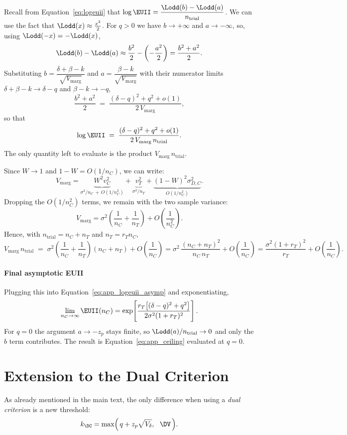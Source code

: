 Recall from Equation~\eqref{eq:logeuii} that $\log\EUII = \dfrac{\Lodd(b)-\Lodd(a)}{n_{\text{trial}}}$. We can use the fact that $\Lodd(x)\approx\tfrac{x^2}{2}$. For $q>0$ we have $b\to+\infty$ and $a\to-\infty$, so, using $\Lodd(-x)=-\Lodd(x)$,
\[
  \Lodd(b)-\Lodd(a) \approx \frac{b^2}{2} - \left(-\frac{a^2}{2}\right) = \frac{b^2+a^2}{2}.
\]
Substituting $b=\dfrac{\delta+\beta-k}{\sqrt{V_{\text{marg}}}}$ and $a=\dfrac{\beta-k}{\sqrt{V_{\text{marg}}}}$ with their numerator limits $\delta+\beta-k\to\delta-q$ and $\beta-k\to-q$,
\[
  \frac{b^2+a^2}{2} \;=\; \frac{(\delta-q)^2+q^2+o(1)}{2\,V_{\text{marg}}},
\]
so that
\begin{equation}\label{eq:app_logeuii_asymp}
  \log\EUII \;=\; \frac{(\delta-q)^2+q^2+o(1)}{2\,V_{\text{marg}}\,n_{\text{trial}}} .
\end{equation}
The only quantity left to evaluate is the product $V_{\text{marg}}\,n_{\text{trial}}$.

Since $W\to1$ and $1-W=O(1/n_C)$, we can write:
\[
  V_{\text{marg}}
  = \underbrace{W^2 v_C^2}_{\sigma^2/n_C \,+\, O(1/n_C^2)}
  + \underbrace{v_T^2}_{\sigma^2/n_T}
  + \underbrace{(1-W)^2 \sigma_{D,C}^2}_{O(1/n_C^2)} .
\]
Dropping the $O(1/n_C^2)$ terms, we remain with the two sample variance:
\[
  V_{\text{marg}} = \sigma^2\!\left(\frac{1}{n_C}+\frac{1}{n_T}\right) + O\!\left(\frac{1}{n_C^2}\right).
\]
Hence, with $n_{\text{trial}}=n_C+n_T$ and $n_T=r_T n_C$,
\[
  V_{\text{marg}}\,n_{\text{trial}}
  \;=\; \sigma^2\!\left(\frac{1}{n_C}+\frac{1}{n_T}\right)(n_C+n_T) + O\!\left(\frac{1}{n_C}\right)
  = \sigma^2\,\frac{(n_C+n_T)^2}{n_C\, n_T} + O\!\left(\frac{1}{n_C}\right)
  = \frac{\sigma^2(1+r_T)^2}{r_T} + O\!\left(\frac{1}{n_C}\right) .
\]

\paragraph{Final asymptotic EUII}
Plugging this into Equation~\eqref{eq:app_logeuii_asymp} and exponentiating,
\begin{equation}\label{eq:app_ceiling}
  \lim_{n_C\to\infty}\EUII(n_C)
  = \exp\!\left[\frac{r_T\big[(\delta-q)^2+q^2\big]}{2\sigma^2(1+r_T)^2}\right].
\end{equation}
For $q=0$ the argument $a\to-z_p$ stays finite, so $\Lodd(a)/n_{\text{trial}}\to0$ and only the $b$ term contributes. The result is Equation~\eqref{eq:app_ceiling} evaluated at $q=0$.


\section{Extension to the Dual Criterion}
As already mentioned in the main text, the only difference when using a \textit{dual criterion} is a new threshold:
\begin{equation}\label{eq:app_kdc}
  k_{\DC} = \max\!\Big(\,q + z_p\sqrt{V_\delta},\ \ \DV\,\Big).
\end{equation}

